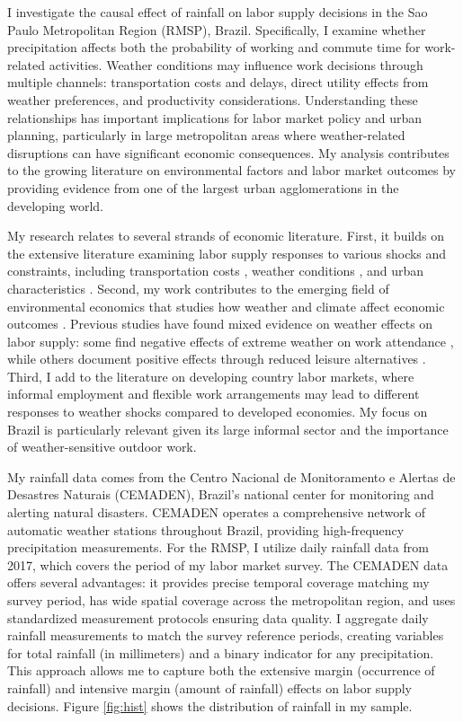 I investigate the causal effect of rainfall on labor supply decisions in the Sao Paulo Metropolitan Region (RMSP), Brazil. Specifically, I examine whether precipitation affects both the probability of working and commute time for work-related activities. Weather conditions may influence work decisions through multiple channels: transportation costs and delays, direct utility effects from weather preferences, and productivity considerations. Understanding these relationships has important implications for labor market policy and urban planning, particularly in large metropolitan areas where weather-related disruptions can have significant economic consequences. My analysis contributes to the growing literature on environmental factors and labor market outcomes by providing evidence from one of the largest urban agglomerations in the developing world.

My research relates to several strands of economic literature. First, it builds on the extensive literature examining labor supply responses to various shocks and constraints, including transportation costs \citep{zenou2009urban}, weather conditions \citep{connolly2008here}, and urban characteristics \citep{moretti2011local}. Second, my work contributes to the emerging field of environmental economics that studies how weather and climate affect economic outcomes \citep{hsiang2016climate}. Previous studies have found mixed evidence on weather effects on labor supply: some find negative effects of extreme weather on work attendance \citep{lee2016temperature}, while others document positive effects through reduced leisure alternatives \citep{connolly2008here}. Third, I add to the literature on developing country labor markets, where informal employment and flexible work arrangements may lead to different responses to weather shocks compared to developed economies. My focus on Brazil is particularly relevant given its large informal sector and the importance of weather-sensitive outdoor work.

My rainfall data comes from the Centro Nacional de Monitoramento e Alertas de Desastres Naturais (CEMADEN), Brazil's national center for monitoring and alerting natural disasters. CEMADEN operates a comprehensive network of automatic weather stations throughout Brazil, providing high-frequency precipitation measurements. For the RMSP, I utilize daily rainfall data from 2017, which covers the period of my labor market survey. The CEMADEN data offers several advantages: it provides precise temporal coverage matching my survey period, has wide spatial coverage across the metropolitan region, and uses standardized measurement protocols ensuring data quality. I aggregate daily rainfall measurements to match the survey reference periods, creating variables for total rainfall (in millimeters) and a binary indicator for any precipitation. This approach allows me to capture both the extensive margin (occurrence of rainfall) and intensive margin (amount of rainfall) effects on labor supply decisions. Figure \ref{fig:hist} shows the distribution of rainfall in my sample.

